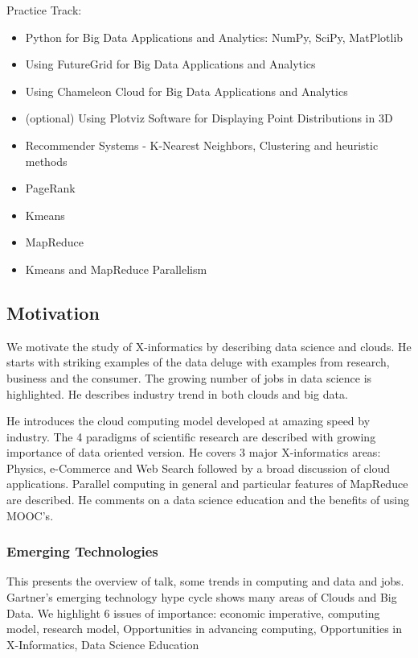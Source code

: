 Practice Track:

\begin{itemize}
\item  Python for Big Data Applications and Analytics: NumPy, SciPy,
  MatPlotlib
\item  Using FutureGrid for Big Data Applications and Analytics 
\item  Using Chameleon Cloud for Big Data Applications and Analytics 
\item (optional) Using Plotviz Software for Displaying Point
  Distributions in 3D
\item  Recommender Systems - K-Nearest Neighbors, Clustering and heuristic
  methods
\item  PageRank
\item  Kmeans
\item  MapReduce
\item  Kmeans and MapReduce Parallelism
\end{itemize}

\subsection{Motivation}

We motivate the study of X-informatics by describing data science and
clouds. He starts with striking examples of the data deluge with
examples from research, business and the consumer. The growing number of
jobs in data science is highlighted. He describes industry trend in both
clouds and big data.

He introduces the cloud computing model developed at amazing speed by
industry. The 4 paradigms of scientific research are described with
growing importance of data oriented version. He covers 3 major
X-informatics areas: Physics, e-Commerce and Web Search followed by a
broad discussion of cloud applications. Parallel computing in general
and particular features of MapReduce are described. He comments on a
data science education and the benefits of using MOOC's.

\subsubsection{Emerging Technologies}\label{emerging-technologies}

This presents the overview of talk, some trends in computing and data
and jobs. Gartner's emerging technology hype cycle shows many areas of
Clouds and Big Data. We highlight 6 issues of importance: economic
imperative, computing model, research model, Opportunities in advancing
computing, Opportunities in X-Informatics, Data Science Education


